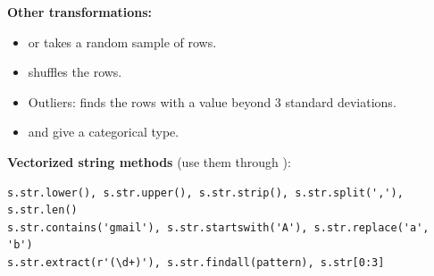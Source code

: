 \textbf{Other transformations:}
\begin{itemize}
  \item {} or  takes a random sample of rows.
  \item {} shuffles the rows.
  \item Outliers:  finds the rows with a value beyond 3 standard deviations.
  \item {} and  give a categorical type.
\end{itemize}

\textbf{Vectorized string methods} (use them through ):
\begin{codebox}
\begin{Verbatim}
s.str.lower(), s.str.upper(), s.str.strip(), s.str.split(','), s.str.len()
s.str.contains('gmail'), s.str.startswith('A'), s.str.replace('a', 'b')
s.str.extract(r'(\d+)'), s.str.findall(pattern), s.str[0:3]
\end{Verbatim}
\end{codebox}

